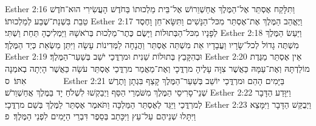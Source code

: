 Esther 2:16	וַתִּלָּקַח אֶסְתֵּר אֶל־הַמֶּלֶךְ אֲחַשְׁוֵרוֹשׁ אֶל־בֵּית מַלְכוּתוֹ בַּחֹדֶשׁ הָעֲשִׂירִי הוּא־חֹדֶשׁ טֵבֵת בִּשְׁנַת־שֶׁבַע לְמַלְכוּתוֹ׃
Esther 2:17	וַיֶּאֱהַב הַמֶּלֶךְ אֶת־אֶסְתֵּר מִכּל־הַנָּשִׁים וַתִּשָּׂא־חֵן וָחֶסֶד לְפָנָיו מִכּל־הַבְּתוּלוֹת וַיָּשֶׂם כֶּתֶר־מַלְכוּת בְּרֹאשָׁהּ וַיַּמְלִיכֶהָ תַּחַת וַשְׁתִּי׃
Esther 2:18	וַיַּעַשׂ הַמֶּלֶךְ מִשְׁתֶּה גָדוֹל לְכל־שָׂרָיו וַעֲבָדָיו אֵת מִשְׁתֵּה אֶסְתֵּר וַהֲנָחָה לַמְּדִינוֹת עָשָׂה וַיִּתֵּן מַשְׂאֵת כְּיַד הַמֶּלֶךְ׃
Esther 2:19	וּבְהִקָּבֵץ בְּתוּלוֹת שֵׁנִית וּמרְדֳּכַי יֹשֵׁב בְּשַׁעַר־הַמֶּלֶךְ׃
Esther 2:20	אֵין אֶסְתֵּר מַגֶּדֶת מוֹלַדְתָּהּ וְאֶת־עַמָּהּ כַּאֲשֶׁר צִוָּה עָלֶיהָ מרְדֳּכָי וְאֶת־מַאֲמַר מרְדֳּכַי אֶסְתֵּר עֹשָׂה כַּאֲשֶׁר הָיְתָה בְאמְנָה אִתּוֹ׃ {ס}        
Esther 2:21	בַּיָּמִים הָהֵם וּמרְדֳּכַי יוֹשֵׁב בְּשַׁעַר־הַמֶּלֶךְ קָצַף בִּגְתָן וָתֶרֶשׁ שְׁנֵי־סָרִיסֵי הַמֶּלֶךְ מִשֹּׁמְרֵי הַסַּף וַיְבַקְשׁוּ לִשְׁלֹחַ יָד בַּמֶּלֶךְ אֲחַשְׁוֵרֹשׁ׃
Esther 2:22	וַיִּוָּדַע הַדָּבָר לְמרְדֳּכַי וַיַּגֵּד לְאֶסְתֵּר הַמַּלְכָּה וַתֹּאמֶר אֶסְתֵּר לַמֶּלֶךְ בְּשֵׁם מרְדֳּכָי׃
Esther 2:23	וַיְבֻקַּשׁ הַדָּבָר וַיִּמָּצֵא וַיִּתָּלוּ שְׁנֵיהֶם עַל־עֵץ וַיִּכָּתֵב בְּסֵפֶר דִּבְרֵי הַיָּמִים לִפְנֵי הַמֶּלֶךְ׃ {פ}
